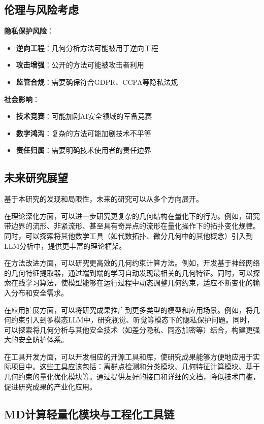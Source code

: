 \subsection{伦理与风险考虑}

\textbf{隐私保护风险}：
\begin{itemize}
\item \textbf{逆向工程}：几何分析方法可能被用于逆向工程
\item \textbf{攻击增强}：公开的方法可能被攻击者利用
\item \textbf{监管合规}：需要确保符合GDPR、CCPA等隐私法规
\end{itemize}

\textbf{社会影响}：
\begin{itemize}
\item \textbf{技术竞赛}：可能加剧AI安全领域的军备竞赛
\item \textbf{数字鸿沟}：复杂的方法可能加剧技术不平等
\item \textbf{责任归属}：需要明确技术使用者的责任边界
\end{itemize}

\subsection{未来研究展望}

基于本研究的发现和局限性，未来的研究可以从多个方向展开。

在理论深化方面，可以进一步研究更复杂的几何结构在量化下的行为。例如，研究带边界的流形、非紧流形、甚至具有奇异点的流形在量化操作下的拓扑变化规律。同时，可以探索将其他数学工具（如代数拓扑、微分几何中的其他概念）引入到LLM分析中，提供更丰富的理论框架。

在方法改进方面，可以研究更高效的几何约束计算方法。例如，开发基于神经网络的几何特征提取器，通过端到端的学习自动发现最相关的几何特征。同时，可以探索在线学习算法，使模型能够在运行过程中动态调整几何约束，适应不断变化的输入分布和安全需求。

在应用扩展方面，可以将研究成果推广到更多类型的模型和应用场景。例如，将几何约束引入到多模态LLM中，研究视觉、听觉等模态下的隐私保护问题。同时，可以探索将几何分析与其他安全技术（如差分隐私、同态加密等）结合，构建更强大的安全防护体系。

在工具开发方面，可以开发相应的开源工具和库，使研究成果能够方便地应用于实际项目中。这些工具应该包括：离群点检测和分类模块、几何特征计算模块、基于几何约束的量化优化模块等。通过提供友好的接口和详细的文档，降低技术门槛，促进研究成果的产业化应用。

\subsection{MD计算轻量化模块与工程化工具链}

